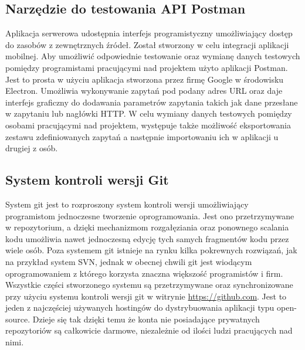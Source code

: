 \subsection{Narzędzie do testowania API Postman}

Aplikacja serwerowa udostępnia interfejs programistyczny umożliwiający dostęp do zasobów z zewnętrznych źródeł. Został stworzony w celu integracji aplikacji mobilnej. Aby umożliwić odpowiednie testowanie oraz wymianę danych testowych pomiędzy programistami pracującymi nad projektem użyto aplikacji Postman. Jest to prosta w użyciu aplikacja stworzona przez firmę Google w środowisku Electron. Umożliwia wykonywanie zapytań pod podany adres URL oraz daje interfejs graficzny do dodawania parametrów zapytania takich jak dane przesłane w zapytaniu lub nagłówki HTTP. \newline
W celu wymiany danych testowych pomiędzy osobami pracującymi nad projektem, występuje także możliwość eksportowania zestawu zdefiniowanych zapytań a następnie importowaniu ich w aplikacji u drugiej z osób.

\subsection{System kontroli wersji Git}

System git jest to rozproszony system kontroli wersji umożliwiający programistom jednoczesne tworzenie oprogramowania. Jest ono przetrzymywane w repozytorium, a dzięki mechanizmom rozgałęziania oraz ponownego scalania kodu umożliwia nawet jednoczesną edycję tych samych fragmentów kodu przez wiele osób. Poza systemem git istnieje na rynku kilka pokrewnych rozwiązań, jak na przykład system SVN, jednak w obecnej chwili git jest wiodącym oprogramowaniem z którego korzysta znaczna większość programistów i firm.\newline
Wszystkie części stworzonego systemu są przetrzymywane oraz synchronizowane przy użyciu systemu kontroli wersji git w witrynie \url{https://github.com}. Jest to jeden z najczęściej używanych hostingów do dystrybuowania aplikacji typu open-source. Dzieje się tak dzięki temu że konta nie posiadające prywatnych repozytoriów są całkowicie darmowe, niezależnie od ilości ludzi pracujących nad nimi.

